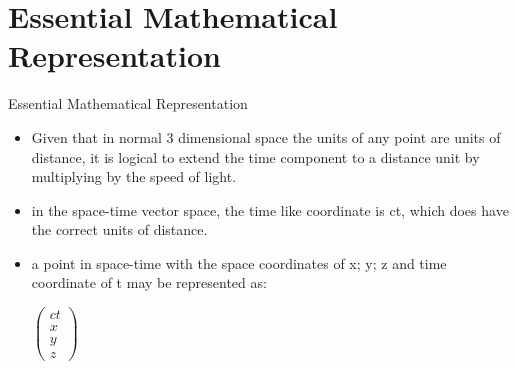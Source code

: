 \documentclass{beamer}
\begin{document}
\section{Essential Mathematical Representation}
\begin{frame}{Essential Mathematical Representation}

\begin{itemize}
\item Given that in normal 3 dimensional space the units of any point
are units of distance, it is logical to extend the time component to a distance unit by multiplying by the speed
of light.
\item in the space-time vector space, the time like coordinate is ct, which does have the correct
units of distance.
\item a point in space-time with the space coordinates of x; y; z and time coordinate of t
may be represented as:
\begin{center}
$\begin{pmatrix}
ct\\
x\\
y\\
z
\end{pmatrix}$
\end{center}
\end{itemize}
\end{frame}
\end{document}
